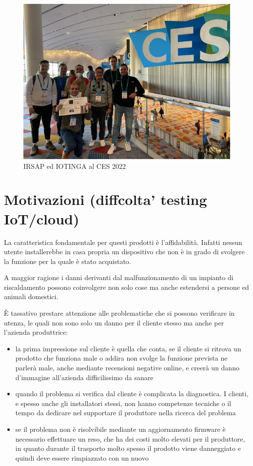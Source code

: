 \documentclass[12pt,a4paper,twoside,titlepage]{book}
\begin{document}
\begin{figure}[ht]
    \centering
    \includegraphics[width=12cm]{img/ces.jpeg}
    \caption{IRSAP ed IOTINGA al CES 2022}
    \label{fig:ces}
\end{figure}

\section{Motivazioni (diffcolta' testing IoT/cloud)}

La caratteristica fondamentale per questi prodotti è l'affidabilità.
Infatti nessun utente installerebbe in casa propria un dispositivo che
non è in grado di svolgere la funzione per la quale è stato acquistato.

A maggior ragione i danni derivanti dal malfunzionamento di un impianto
di riscaldamento possono coinvolgere non solo cose ma anche estendersi
a persone ed animali domestici.

È tassativo prestare attenzione alle problematiche che si possono verificare
in utenza, le quali non sono solo un danno per il cliente stesso ma anche
per l'azienda produttrice:

\begin{itemize}
\item la prima impressione sul cliente è quella che conta, se il cliente si ritrova
    un prodotto che funziona male o addira non svolge la funzione prevista ne parlerà
    male, anche mediante recensioni negative online, e creerà un danno d'immagine all'azienda
    difficilissimo da sanare
\item quando il problema si verifica dal cliente è complicata la diagnostica. I clienti,
    e spesso anche gli installatori stessi, non hanno competenze tecniche o il
    tempo da dedicare nel supportare il produttore nella ricerca del problema
\item se il problema non è risolvibile mediante un aggiornamento firmware è necessario
    effettuare un reso, che ha dei costi molto elevati per il produttore, in quanto
    durante il trasporto molto spesso il prodotto viene danneggiato e quindi deve
    essere rimpiazzato con un nuovo
\end{itemize}
\end{document}
